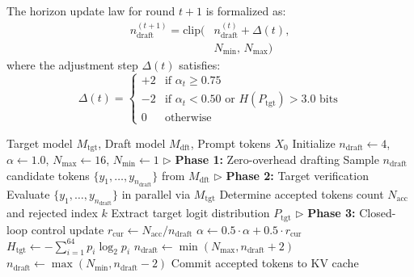 \documentclass[journal,10pt,twocolumn]{IEEEtran}
\newcommand{\ttg}{\mathrm{tgt}}
\newcommand{\dft}{\mathrm{dft}}
\newcommand{\ctspec}{\mbox{CT-Spec}}
\begin{document}
The horizon update law for round $t+1$ is formalized as:
\begin{equation}
\begin{split}
n_{\mathrm{draft}}^{(t+1)} = \mathrm{clip}\bigl(& n_{\mathrm{draft}}^{(t)} + \Delta(t), \\
& N_{\min},\, N_{\max}\bigr)
\end{split}
\end{equation}
where the adjustment step $\Delta(t)$ satisfies:
\begin{equation}
\Delta(t) =
\begin{cases}
+2 & \text{if } \alpha_t \ge 0.75 \\
-2 & \text{if } \alpha_t < 0.50 \text{ or } H(P_{\mathrm{tgt}}) > 3.0 \text{ bits} \\
0 & \text{otherwise}
\end{cases}
\end{equation}

\begin{algorithm}[!t]
\caption{\ctspec{} Closed-Loop Execution Loop}
\label{alg:ctspec}
\small
\begin{algorithmic}[1]
\REQUIRE Target model $M_{\ttg}$, Draft model $M_{\dft}$, Prompt tokens $X_0$
\STATE Initialize $n_{\mathrm{draft}} \leftarrow 4$, $\alpha \leftarrow 1.0$, $N_{\max} \leftarrow 16$, $N_{\min} \leftarrow 1$
    \STATE $\triangleright$ \textbf{Phase 1:} Zero-overhead drafting
    \STATE Sample $n_{\mathrm{draft}}$ candidate tokens $\{y_1, \dots, y_{n_{\mathrm{draft}}}\}$ from $M_{\dft}$
    \STATE $\triangleright$ \textbf{Phase 2:} Target verification
    \STATE Evaluate $\{y_1, \dots, y_{n_{\mathrm{draft}}}\}$ in parallel via $M_{\ttg}$
    \STATE Determine accepted tokens count $N_{\mathrm{acc}}$ and rejected index $k$
    \STATE Extract target logit distribution $P_{\mathrm{tgt}}$
    \STATE $\triangleright$ \textbf{Phase 3:} Closed-loop control update
    \STATE $r_{\mathrm{cur}} \leftarrow N_{\mathrm{acc}} / n_{\mathrm{draft}}$
    \STATE $\alpha \leftarrow 0.5 \cdot \alpha + 0.5 \cdot r_{\mathrm{cur}}$
    \STATE $H_{\mathrm{tgt}} \leftarrow -\sum_{i=1}^{64} p_i \log_2 p_i$
        \STATE $n_{\mathrm{draft}} \leftarrow \min(N_{\max}, n_{\mathrm{draft}} + 2)$
        \STATE $n_{\mathrm{draft}} \leftarrow \max(N_{\min}, n_{\mathrm{draft}} - 2)$
    \ENDIF
    \STATE Commit accepted tokens to KV cache
\ENDWHILE
\end{algorithmic}
\end{algorithm}
\end{document}
